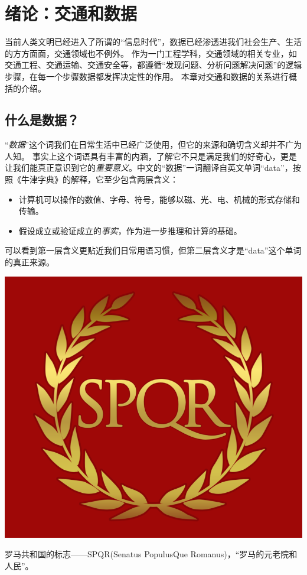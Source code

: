 \chapter{绪论：交通和数据}

当前人类文明已经进入了所谓的“信息时代”，数据已经渗透进我们社会生产、生活的方方面面，交通领域也不例外。
作为一门工程学科，交通领域的相关专业，如交通工程、交通运输、交通安全等，都遵循“发现问题、分析问题解决问题”的逻辑步骤，在每一个步骤数据都发挥决定性的作用。
本章对交通和数据的关系进行概括的介绍。

\section{什么是数据？}

“\emph{数据}”这个词我们在日常生活中已经广泛使用，但它的来源和确切含义却并不广为人知。
事实上这个词语具有丰富的内涵，了解它不只是满足我们的好奇心，更是让我们能真正意识到它的\emph{重要意义}。中文的“数据”一词翻译自英文单词“data”，按照《牛津字典》的解释，它至少包含两层含义：
\begin{itemize}
    \item 计算机可以操作的数值、字母、符号，能够以磁、光、电、机械的形式存储和传输。
    \item 假设成立或验证成立的\emph{事实}，作为进一步推理和计算的基础。
\end{itemize}
可以看到第一层含义更贴近我们日常用语习惯，但第二层含义才是“data”这个单词的真正来源。

\begin{marginfigure}[-10cm]
\includegraphics[width=\linewidth]{images/spqr.png}
\caption{罗马共和国的标志——SPQR(Senatus PopulusQue Romanus)，“罗马的元老院和人民”。}
\end{marginfigure}

